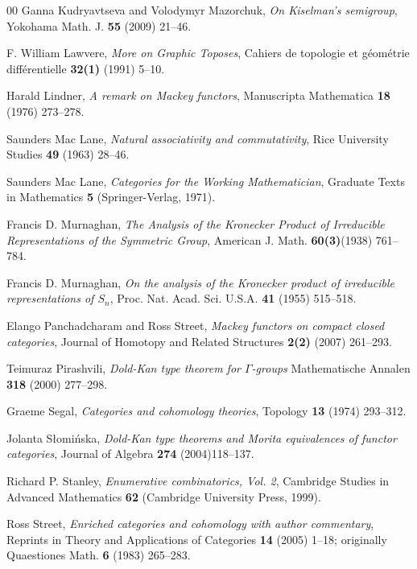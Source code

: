 \documentclass[a4paper,12pt,reqno]{amsart}
\theoremstyle{definition}
\theoremstyle{fact}
\theoremstyle{genquest}
\theoremstyle{step}
\begin{document}
\begin{thebibliography}{00}
 Ganna Kudryavtseva and Volodymyr Mazorchuk, 
\textit{On Kiselman's semigroup}, Yokohama Math. J. \textbf{55} (2009) 21--46.\label{KM09} 

 F. William Lawvere, \textit{More on Graphic Toposes}, Cahiers de topologie et g\'eom\'etrie diff\'erentielle \textbf{32(1)} (1991) 5--10.\label{Law91}

 Harald Lindner, \textit{A remark on Mackey functors}, 
Manuscripta Mathematica \textbf{18} (1976) 273--278.\label{Lindner1976}

 Saunders Mac Lane, \textit{Natural associativity and commutativity}, 
Rice University Studies \textbf{49} (1963) 28--46.\label{ML1963}

 Saunders Mac Lane, \textit{Categories for the Working Mathematician}, 
Graduate Texts in Mathematics \textbf{5} (Springer-Verlag, 1971).\label{CWM} 

 Francis D. Murnaghan, \textit{The Analysis of the Kronecker Product of Irreducible Representations of the Symmetric Group}, American J. Math. \textbf{60(3)}(1938) 761--784.\label{Mur38}

 Francis D. Murnaghan, \textit{On the analysis of the Kronecker product of irreducible representations of $S_n$}, Proc. Nat. Acad. Sci. U.S.A. \textbf{41} (1955) 515--518.\label{Mur55}

 Elango Panchadcharam and Ross Street, \textit{Mackey functors on compact closed categories}, Journal of Homotopy and Related Structures \textbf{2(2)} (2007) 261--293.\label{PanSt}

 Teimuraz Pirashvili, \textit{Dold-Kan type theorem for $\Gamma$-groups}  
Mathematische Annalen \textbf{318} (2000) 277--298.\label{Pirash00}

 Graeme Segal, \textit{Categories and cohomology theories}, 
Topology \textbf{13} (1974) 293--312.\label{Segal}

 Jolanta S\l omi\'nska, \textit{Dold-Kan type theorems and Morita equivalences of functor categories}, Journal of Algebra \textbf{274} (2004)118--137.\label{Slom}

 Richard P. Stanley, \textit{Enumerative combinatorics, Vol. 2}, Cambridge Studies in Advanced Mathematics \textbf{62} (Cambridge University Press, 1999).\label{Sta99} 

 Ross Street, \textit{Enriched categories and cohomology with author commentary}, Reprints in Theory and Applications of Categories \textbf{14} (2005) 1--18;
originally Quaestiones Math. \textbf{6} (1983) 265--283.\label{ECC}


\end{thebibliography}
\end{document}
